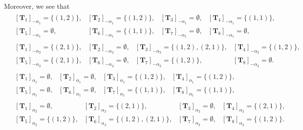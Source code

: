 \documentclass[12pt]{amsart}
\numberwithin{equation}{thm}
\newcommand\bT{\mathbf T}
\renewcommand\a{\alpha}  %
\begin{document}
Moreover, we see that 
\begin{align*}
&\begin{array}{llll}
[\bT_1]_{-\a_1} = \{(1,2)\}, 
&
[\bT_2]_{-\a_1} = \{(1,2)\}, 
&
[\bT_3]_{-\a_1} = \emptyset, 
&
[\bT_4]_{-\a_1} =\{(1,1)\}, 
\\[0.5em]
[\bT_5]_{-\a_1} = \emptyset, 
& 
[\bT_6]_{-\a_1} = \{(1,1)\}, 
& 
[\bT_7]_{-\a_1} = \emptyset, 
& 
[\bT_8]_{-\a_1} = \emptyset, 
\end{array}
\\[1em]
&\begin{array}{llll}
[\bT_1]_{-\a_2} = \{ (2,1)\}, 
&
[\bT_2]_{-\a_2} = \emptyset, 
&
[\bT_3]_{-\a_2} = \{ (1,2), (2,1)\}, 
&
[\bT_4]_{-\a_2} = \{(1,2)\}, 
\\[0.5em]
[\bT_5]_{-\a_2} = \{(2,1)\}, 
& 
[\bT_6]_{-\a_2} = \emptyset, 
& 
[\bT_7]_{-\a_2} = \{(1,2)\}, 
& 
[\bT_8]_{-\a_2} = \emptyset. 
\end{array}
\\[1em]
&\begin{array}{llll}
[\bT_1]_{\a_1} = \emptyset, 
&
[\bT_2]_{\a_1} = \emptyset, 
&
[\bT_3]_{\a_1} = \{(1,2)\}, 
&
[\bT_4]_{\a_1} = \{(1,2)\}, 
\\[0.5em]
[\bT_5]_{\a_1} = \emptyset, 
& 
[\bT_6]_{\a_1} = \emptyset, 
& 
[\bT_7]_{\a_1} = \{(1,1)\}, 
& 
[\bT_8]_{\a_1} = \{(1,1)\}, 
\end{array}
\\[1em]
&\begin{array}{llll}
[\bT_1]_{\a_2} = \emptyset, 
&
[\bT_2]_{\a_2} = \{(2,1)\}, 
&
[\bT_3]_{\a_2} = \emptyset, 
&
[\bT_4]_{\a_2} = \{(2,1)\}, 
\\[0.5em]
[\bT_5]_{\a_2} = \{(1,2)\}, 
& 
[\bT_6]_{\a_2} = \{ (1,2), (2,1)\}, 
& 
[\bT_7]_{\a_2} = \emptyset, 
& 
[\bT_8]_{\a_2} = \{(1,2)\}. 
\end{array}
\end{align*}
\end{document}
